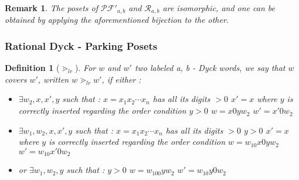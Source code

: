 \documentclass[12pt]{report}
\newtheorem{definition}{Definition}
\newtheorem*{rem}{Remark}
\begin{document}
\begin{rem}
    The posets of $\mathcal{PF'}_{a,b}$ and $\mathcal{R}_{a,b}$
    are isomorphic, and one can be obtained by
    applying the aforementioned bijection to the other.
\end{rem}

\subsubsection{Rational Dyck - Parking Posets}

\begin{definition}[$\gtrdot_{lr}$]
    For $w$ and $w'$ two labeled a, b - Dyck words, we say
    that $w$ covers $w'$, written $w \gtrdot_{lr} w'$,
    if either :
    \begin{itemize}
        \item $\exists w_2, x, x', y$ such that :
            \subitem $x = x_1x_2 \cdots x_n$ has all 
            its digits $> 0$
            \subitem $x' = x$ where $y$ is correctly
            inserted regarding the order condition
            \subitem $y > 0$
            \subitem $w = x0yw_2$
            \subitem $w' = x'0w_2$
        \item $\exists w_1, w_2, x, x', y$ such that :
            \subitem $x = x_1x_2 \cdots x_n$ has all 
                its digits $> 0$
            \subitem $y > 0$
            \subitem $x' = x$ where $y$ is correctly
                inserted regarding the order condition
            \subitem $w = w_10x0yw_2$
            \subitem $w' = w_10x'0w_2$
        \item or $\exists w_1, w_2, y$ such that :
            \subitem $y > 0$
            \subitem $w = w_100yw_2$
            \subitem $w' = w_10y0w_2$
    \end{itemize}  
\end{definition}
\end{document}
